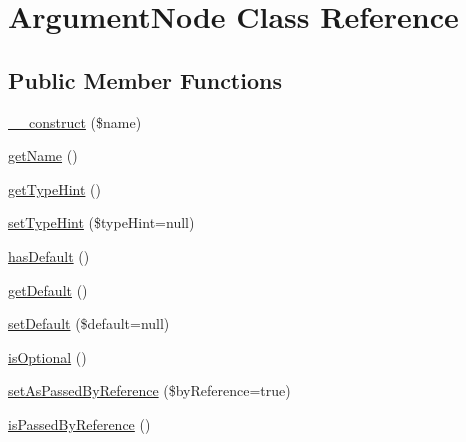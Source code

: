 \hypertarget{class_prophecy_1_1_doubler_1_1_generator_1_1_node_1_1_argument_node}{}\section{Argument\+Node Class Reference}
\label{class_prophecy_1_1_doubler_1_1_generator_1_1_node_1_1_argument_node}
\subsection*{Public Member Functions}
\begin{DoxyCompactItemize}
\item 
\mbox{\hyperlink{class_prophecy_1_1_doubler_1_1_generator_1_1_node_1_1_argument_node_a4717bbfc70a40a57ee741ed70766c309}{\+\_\+\+\_\+construct}} (\$name)
\item 
\mbox{\hyperlink{class_prophecy_1_1_doubler_1_1_generator_1_1_node_1_1_argument_node_a3d0963e68bb313b163a73f2803c64600}{get\+Name}} ()
\item 
\mbox{\hyperlink{class_prophecy_1_1_doubler_1_1_generator_1_1_node_1_1_argument_node_a996e921c33e075c453f344e4a6e2bacd}{get\+Type\+Hint}} ()
\item 
\mbox{\hyperlink{class_prophecy_1_1_doubler_1_1_generator_1_1_node_1_1_argument_node_a5f56deb69de774b21d1f6605157c9b3e}{set\+Type\+Hint}} (\$type\+Hint=null)
\item 
\mbox{\hyperlink{class_prophecy_1_1_doubler_1_1_generator_1_1_node_1_1_argument_node_aed58b10f7f6757a120e8428ceb660bc1}{has\+Default}} ()
\item 
\mbox{\hyperlink{class_prophecy_1_1_doubler_1_1_generator_1_1_node_1_1_argument_node_adc30a2a4d3e48cb6aee21562afbc4022}{get\+Default}} ()
\item 
\mbox{\hyperlink{class_prophecy_1_1_doubler_1_1_generator_1_1_node_1_1_argument_node_aae7b38e461eb4bb55b0fc924ca924201}{set\+Default}} (\$default=null)
\item 
\mbox{\hyperlink{class_prophecy_1_1_doubler_1_1_generator_1_1_node_1_1_argument_node_aa771d9e74542caa5d10f197d706fdecc}{is\+Optional}} ()
\item 
\mbox{\hyperlink{class_prophecy_1_1_doubler_1_1_generator_1_1_node_1_1_argument_node_aaa5da608ce1393ddb4bcbb9bec4eef65}{set\+As\+Passed\+By\+Reference}} (\$by\+Reference=true)
\item 
\mbox{\hyperlink{class_prophecy_1_1_doubler_1_1_generator_1_1_node_1_1_argument_node_a1c15c6514e5dfbeaec34cc4481fe813e}{is\+Passed\+By\+Reference}} ()

\end{DoxyCompactItemize}
